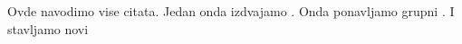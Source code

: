 \documentclass{article}
\begin{document}
Ovde navodimo vise citata\cite{knj1,knj2,cl1}. 
Jedan onda izdvajamo \cite{knj1}.
Onda ponavljamo grupni \cite{knj1,knj2,cl1}.
I stavljamo novi \cite{knj2}



\end{document}
